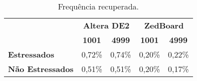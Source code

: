 \begin{table}[H]
\centering
\caption{Frequência recuperada.}
\begin{tabular}{l|cc|cc|}
\cline{2-5}
 & \multicolumn{2}{c|}{\textbf{Altera DE2}} & \multicolumn{2}{c|}{\textbf{ZedBoard}} \\ \cline{2-5} 
 & \multicolumn{1}{c|}{\textbf{1001}} & \textbf{4999} & \multicolumn{1}{c|}{\textbf{1001}} & \textbf{4999} \\ \hline
\multicolumn{1}{|l|}{\multirow{2}{*}{\textbf{Estressados}}} & \multicolumn{1}{c|}{\multirow{2}{*}{0,72\%}} & \multirow{2}{*}{0,74\%} & \multicolumn{1}{c|}{\multirow{2}{*}{0,20\%}} & \multirow{2}{*}{0,22\%} \\
\multicolumn{1}{|l|}{} & \multicolumn{1}{c|}{} &  & \multicolumn{1}{c|}{} &  \\ \hline
\multicolumn{1}{|l|}{\multirow{2}{*}{\textbf{Não Estressados}}} & \multicolumn{1}{c|}{\multirow{2}{*}{0,51\%}} & \multirow{2}{*}{0,51\%} & \multicolumn{1}{c|}{\multirow{2}{*}{0,20\%}} & \multirow{2}{*}{0,17\%} \\
\multicolumn{1}{|l|}{} & \multicolumn{1}{c|}{} &  & \multicolumn{1}{c|}{} &  \\ \hline
\end{tabular}
\label{tab:Relax}
\end{table}